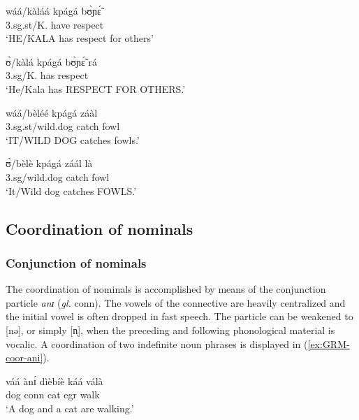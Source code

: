 \begin{exe}
\begin{exe}
\begin{exe}
{\begin{exe}
\begin{exe}
\begin{exe}
\begin{exe}
\begin{exe}
\begin{exe}
\begin{exe}
\begin{xlist}
\begin{exe}
\begin{exe}
\begin{exe}
\begin{exe}
\begin{exe}
\begin{exe}
\ea\label{ex:GRM-foc-lenght}
  \ea\label{ex:GRM-foc-w-lenght}
 \gll wáá/kàláá kpágá bʊ̀ɲɛ̃́\\
 {\sc 3.sg.st}/K.{\foc}  have respect\\
 \glt  `HE/KALA has respect for others'

   \ex\label{ex:GRM-foc-n-lenght} 
 \gll ʊ̀/kàlá kpágá bʊ̀ɲɛ̃́ rá\\
{\sc 3.sg}/K.  has respect {\foc}\\
\glt `He/Kala has RESPECT FOR OTHERS.' 

 \ex\label{ex:GRM-foc-w-lenght-2} 
\gll  wáá/bèléé kpágá záàl\\
 {\sc 3.sg.st}/wild.dog catch fowl\\
 \glt   `IT/WILD DOG catches fowls.'

\ex\label{ex:GRM-foc-w-lenght-2} 
\gll  ʊ̀/bèlè kpágá záál là\\
 {\sc 3.sg}/wild.dog catch fowl {\foc}\\
 \glt  `It/Wild dog catches FOWLS.'

\z
\z



\subsection{Coordination of nominals}
\label{sec:GRM-coord-nom}

\subsubsection{Conjunction of nominals}
\label{sec:GRM-conjunc-nom}



The coordination of nominals is accomplished by means of the conjunction
particle {\it anɪ} ({\it gl.} {\sc conn}).  The vowels of the connective are 
heavily
centralized and the initial vowel is often dropped in fast speech.
The particle can be weakened to [nə], or simply [n̩], when the preceding and
following phonological material is vocalic.  A coordination of two indefinite
noun phrases is displayed in (\ref{ex:GRM-coor-ani}). 

\begin{exe}
 \ex\label{ex:GRM-coor-ani} 
 
 \gll váá ànɪ́ dìèbíè káá válà \\
dog {\sc conn} cat {\sc  egr} walk\\
 \glt  `A dog and a cat are walking.'
\z


\end{exe}
\end{exe}
\end{exe}
\end{exe}
\end{exe}
\end{exe}
\end{exe}
\end{xlist}
\end{exe}
\end{exe}
\end{exe}
\end{exe}
\end{exe}
\end{exe}
\end{exe}}
\end{exe}
\end{exe}
\end{exe}
